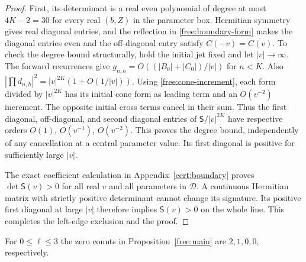 \begin{proof}
First, its determinant is a real even polynomial of degree at most
$4K-2=30$ for every real $(b,Z)$ in the parameter box.  Hermitian
symmetry gives real diagonal entries, and the reflection in
\eqref{free:boundary-form} makes the diagonal entries even and the
off-diagonal entry satisfy $C(-v)=\overline{C(v)}$.  To check the degree
bound structurally, hold the initial jet fixed and let $|v|\to\infty$.
The forward recurrences give $g_{n,h}=O((|B_0|+|C_0|)/|v|)$ for
$n<K$.  Also $|\prod d_{n,h}|^2=|v|^{2K}(1+O(1/|v|))$.
Using \eqref{free:cone-increment}, each form divided by $|v|^{2K}$
has its initial cone form as leading term and an $O(v^{-2})$
increment.  The opposite initial cross terms cancel in their sum.
Thus the first diagonal, off-diagonal, and second diagonal entries of
$\mathsf S/|v|^{2K}$ have respective orders $O(1)$, $O(v^{-1})$,
$O(v^{-2})$.  This proves the degree bound, independently of any
cancellation at a central parameter value.  Its first diagonal is
positive for sufficiently large $|v|$.

The exact coefficient calculation in Appendix~\ref{cert:boundary}
proves $\det\mathsf S(v)>0$ for all real $v$ and all parameters in
$\mathcal D$.  A continuous Hermitian matrix with strictly positive
determinant cannot change its signature.  Its positive first diagonal
at large $|v|$ therefore implies $\mathsf S(v)>0$ on the whole line.
This completes the left-edge exclusion and the proof.
\end{proof}

\begin{lemma}\label{free:winding}
For $0\le\ell\le3$ the zero counts in Proposition~\ref{free:main} are
$2,1,0,0$, respectively.
\end{lemma}

